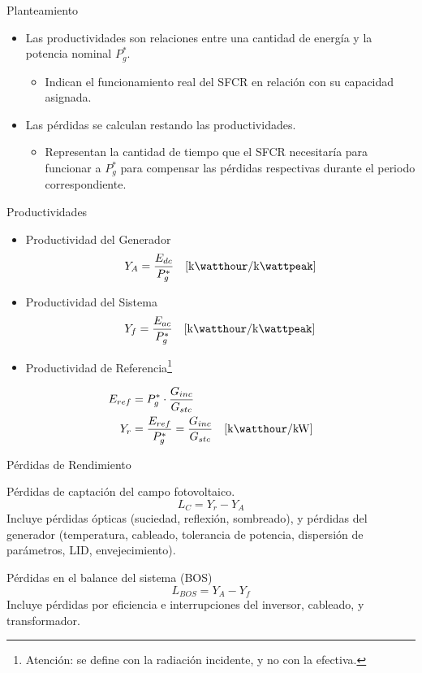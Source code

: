 \documentclass[aspectratio=169, usenames,svgnames,dvipsnames]{beamer}
\begin{document}
\begin{frame}[label={sec:org3f37b54}]{Planteamiento}
\begin{itemize}
\item Las \alert{productividades} son relaciones entre una cantidad de energía y la potencia nominal \(P_g^*\).
\begin{itemize}
\item Indican el funcionamiento real del SFCR en relación con su capacidad asignada.
\end{itemize}
\item Las \alert{pérdidas} se calculan restando las productividades.
\begin{itemize}
\item Representan la cantidad de tiempo que el SFCR necesitaría para funcionar a \(P_g^*\) para compensar las pérdidas respectivas durante el periodo correspondiente.
\end{itemize}
\end{itemize}
\end{frame}
\begin{frame}[label={sec:org2b5ac33}]{Productividades}
\begin{itemize}
\item Productividad del Generador 
\[
  Y_A = \frac{E_{dc}}{P_g^*} \quad [\unit{\kilo\watthour\per\kilo\wattpeak}]
\]

\item Productividad del Sistema
\[
  Y_f = \frac{E_{ac}}{P_g^*} \quad [\unit{\kilo\watthour\per\kilo\wattpeak}]
\]

\item Productividad de Referencia\footnote{Atención: se define con la radiación incidente, y no con la efectiva.}
\end{itemize}
\begin{align*}
  E_{ref} &= P_g^* \cdot \frac{G_{inc}}{G_{stc}}\\
  Y_r &= \frac{E_{ref}}{P_g^*} = \frac{G_{inc}}{G_{stc}} \quad [\unit{\kilo\watthour\per\kilo\watt}]
\end{align*}
\end{frame}
\begin{frame}[label={sec:org046fa35}]{Pérdidas de Rendimiento}
\begin{block}{Pérdidas de captación del campo fotovoltaico.}
\[
  L_C = Y_r - Y_A
\]
Incluye pérdidas ópticas (suciedad, reflexión, sombreado), y pérdidas del generador (temperatura, cableado, tolerancia de potencia, dispersión de parámetros, LID, envejecimiento).
\end{block}

\begin{block}{Pérdidas en el balance del sistema (BOS)}
\[
  L_{BOS} = Y_A - Y_f
\]
Incluye pérdidas por eficiencia e interrupciones del inversor, cableado,  y transformador.
\end{block}
\end{frame}
\end{document}
